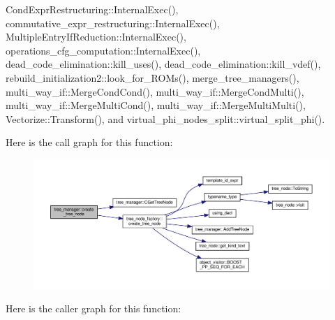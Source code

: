 Cond\+Expr\+Restructuring\+::\+Internal\+Exec(), commutative\+\_\+expr\+\_\+restructuring\+::\+Internal\+Exec(), Multiple\+Entry\+If\+Reduction\+::\+Internal\+Exec(), operations\+\_\+cfg\+\_\+computation\+::\+Internal\+Exec(), dead\+\_\+code\+\_\+elimination\+::kill\+\_\+uses(), dead\+\_\+code\+\_\+elimination\+::kill\+\_\+vdef(), rebuild\+\_\+initialization2\+::look\+\_\+for\+\_\+\+R\+O\+Ms(), merge\+\_\+tree\+\_\+managers(), multi\+\_\+way\+\_\+if\+::\+Merge\+Cond\+Cond(), multi\+\_\+way\+\_\+if\+::\+Merge\+Cond\+Multi(), multi\+\_\+way\+\_\+if\+::\+Merge\+Multi\+Cond(), multi\+\_\+way\+\_\+if\+::\+Merge\+Multi\+Multi(), Vectorize\+::\+Transform(), and virtual\+\_\+phi\+\_\+nodes\+\_\+split\+::virtual\+\_\+split\+\_\+phi().

Here is the call graph for this function\+:
\nopagebreak
\begin{figure}[H]
\begin{center}
\leavevmode
\includegraphics[width=350pt]{d2/ddd/classtree__manager_a6a73965fdf587f77158f5dc384e037a1_cgraph}
\end{center}
\end{figure}
Here is the caller graph for this function\+:
\nopagebreak
